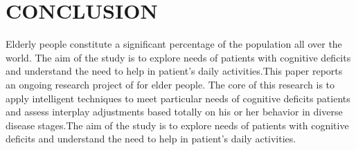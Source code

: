 \chapter{CONCLUSION}
Elderly people constitute a significant percentage of the population all over the world. The aim of the study is to explore needs of patients with cognitive deficits and understand the need to help in patient’s daily activities.This paper reports an ongoing research project of for elder people. The core of this research is to apply intelligent techniques to meet particular needs of cognitive deficits patients and assess interplay adjustments based totally on his or her behavior in diverse disease stages.The aim of the study is to explore needs of patients with cognitive deficits and understand the need to help in patient’s daily activities. 















